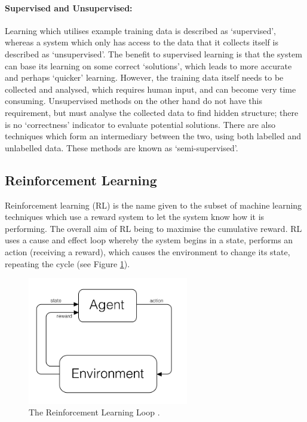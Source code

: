 \documentclass[a4paper,oneside]{report}
\begin{document}
\paragraph{Supervised and Unsupervised:} Learning which utilises example training data is described as `supervised', whereas a system which only has access to the data that it collects itself is described as `unsupervised'. The benefit to supervised learning is that the system can base its learning on some correct `solutions', which leads to more accurate and perhaps `quicker' learning. However, the training data itself needs to be collected and analysed, which requires human input, and can become very time consuming. Unsupervised methods on the other hand do not have this requirement, but must analyse the collected data to find hidden structure; there is no `correctness' indicator to evaluate potential solutions. There are also techniques which form an intermediary between the two, using both labelled and unlabelled data. These methods are known as `semi-supervised'.

\subsection{Reinforcement Learning}

Reinforcement learning (RL) is the name given to the subset of machine learning techniques which use a reward system to let the system know how it is performing. The overall aim of RL being to maximise the cumulative reward. RL uses a cause and effect loop whereby the system begins in a state, performs an action (receiving a reward), which causes the environment to change its state, repeating the cycle (see Figure \ref{fig:Screen}).

\begin{figure}[h!]
  \centering
    \includegraphics[width=70mm]{sources/images/RLDiagram}
    \caption{The Reinforcement Learning Loop \cite{Nilsson:2010qa}.}
    \label{fig:Screen}
\end{figure}
\end{document}

